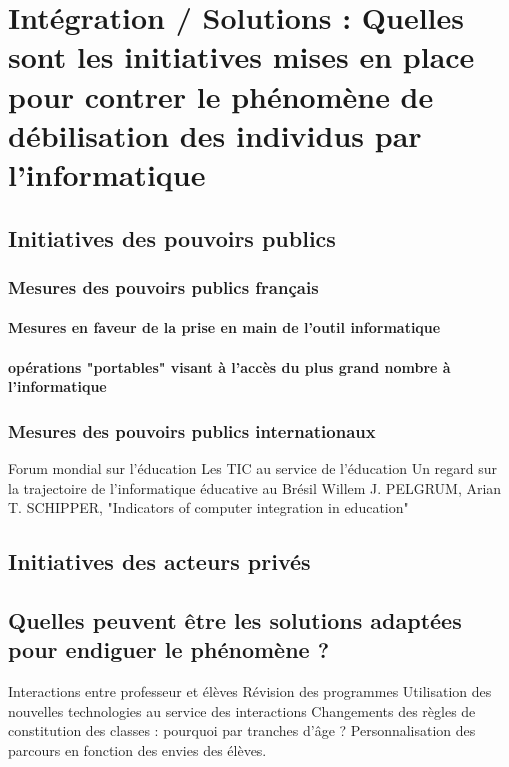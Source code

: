 
\chapter{Intégration / Solutions : Quelles sont les initiatives mises en place pour contrer le phénomène de débilisation des individus par l'informatique}\label{initiatives_actuelles}

\section{Initiatives des pouvoirs publics}

\subsection{Mesures des pouvoirs publics français}
\subsubsection{Mesures en faveur de la prise en main de l'outil informatique}
\cite{b2i_c2i}
\cite{b2i}
\cite{isn}

\subsubsection{opérations "portables" visant à l'accès du plus grand nombre à l'informatique}
\cite{portables35}
\cite{portables60}
\cite{portables40}

    


\subsection{Mesures des pouvoirs publics internationaux}
Forum mondial sur l’éducation \cite{educ_forum}
Les TIC au service de l’éducation \cite{tics}
Un regard sur la trajectoire de l’informatique éducative au Brésil \cite{peixoto2006regard}
Willem J. PELGRUM, Arian T. SCHIPPER, "Indicators of computer integration in education" \cite{pelgrum1993indicators}



\section{Initiatives des acteurs privés}



\section{Quelles peuvent être les solutions adaptées pour endiguer le phénomène ?}\label{solutions}

Interactions entre professeur et élèves
Révision des programmes
Utilisation des nouvelles technologies au service des interactions
Changements des règles de constitution des classes : pourquoi par tranches d'âge ?
Personnalisation des parcours en fonction des envies des élèves.


